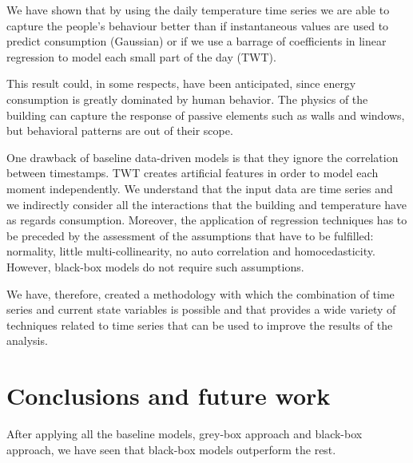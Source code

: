 \documentclass[10pt, conference, compsocconf]{IEEEtran}
\begin{document}


We have shown that by using the daily temperature time series we are able to capture the people's behaviour better than if instantaneous values are used to predict consumption (Gaussian) or if we use a barrage of coefficients in linear regression to model each small part of the day (TWT). 

This result could, in some respects, have been anticipated, since energy consumption is greatly dominated by human behavior. The physics of the building can capture the response of passive elements such as walls and windows, but behavioral patterns are out of their scope.

One drawback of baseline data-driven models is that they ignore the correlation between timestamps. TWT creates artificial features in order to model each moment independently. We understand that the input data are time series and we indirectly consider all the interactions that the building and temperature have as regards consumption.
Moreover, the application of regression techniques has to be preceded by the assessment of the assumptions that have to be fulfilled: normality, little multi-collinearity, no auto correlation and homocedasticity. However, black-box models do not require such assumptions.


We have, therefore, created a methodology with which the combination of time series and current state variables is possible and that provides a wide variety of techniques related to time series that can be used to improve the results of the analysis.

\section{Conclusions and future work}

After applying all the baseline models, grey-box approach and black-box approach, we have seen that black-box models outperform the rest.

\end{document}
